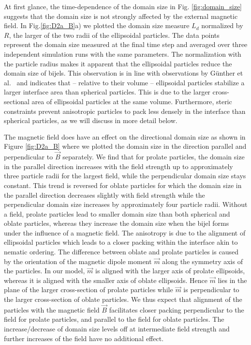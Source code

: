 At first glance, the time-dependence of the domain size in Fig.
\ref{fig:domain_size} suggests that the domain size is not strongly
affected by the external magnetic field. In Fig.\ref{fig:D2a_B}a) we
plotted the domain size measure \(L_d\) normalized by \(R\), the larger
of the two radii of the ellipsoidal particles. The data points represent
the domain size measured at the final time step and averaged over three
independent simulation runs with the same parameters. The normalization
with the particle radius makes it apparent that the ellipsoidal
particles reduce the domain size of bijels. This observation is in line
with observations by Günther et al.~\cite{gunther_timescales_2014} and
indicates that -- relative to their volume -- ellipsoidal particles
stabilize a larger interface area than spherical particles. This is due
to the larger cross-sectional area of ellipsoidal particles at the same
volume. Furthermore, steric constraints prevent anisotropic particles to
pack less densely in the interface than spherical particles, as we will
discuss in more detail below.

The magnetic field does have an effect on the directional
domain size as shown in Figure \ref{fig:D2a_B} where we plotted the
domain size in the direction parallel and perpendicular to \(\vec{B}\)
separately. We find that for prolate particles, the domain size in the
parallel direction increases with the field strength up to approximately
three particle radii for the largest field, while the perpendicular
domain size stays constant. This trend is reversed for oblate particles
for which the domain size in the parallel direction decreases slightly
with field strength while the perpendicular domain size increases by
approximately four particle radii. Without a field, prolate
particles lead to smaller domain size than both spherical and oblate
particles, whereas they increase the domain size when the bijel forms under the
influence of a magnetic field. The anisotropy is due to the alignment of
ellipsoidal particles which leads to a closer packing within the
interface akin to nematic ordering. The difference between oblate and
prolate particles is caused by the orientation of the magnetic dipole
moment \(\vec{m}\) along the symmetry axis of the particles. In our
model, \(\vec{m}\) is aligned with the larger axis of prolate
ellipsoids, whereas it is aligned with the smaller axis of oblate
ellipsoids. Hence \(\vec{m}\) lies in the plane of the larger
cross-section of prolate particles while \(\vec{m}\) is perpendicular to
the larger cross-section of oblate particles. We thus expect that
alignment of the particles with the magnetic field \(\vec{B}\)
facilitates closer packing perpendicular to the field for prolate
particles, and parallel to the field for oblate particles. The
increase/decrease of domain size levels off at intermediate field
strength and further increases of the field have no additional effect.

